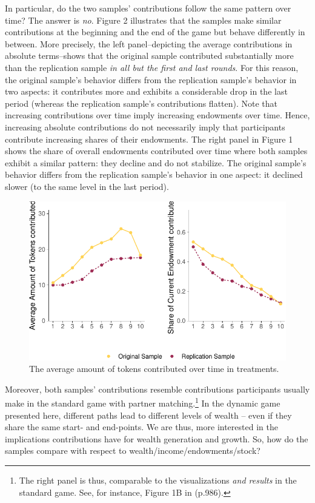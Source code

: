 \documentclass[
  authoryear,
  preprint,
  3p]{elsarticle}
\begin{document}
In particular, do the two samples' contributions follow the same pattern
over time? The answer is \emph{no}. Figure 2 illustrates that the
samples make similar contributions at the beginning and the end of the
game but behave differently in between. More precisely, the left
panel--depicting the average contributions in absolute terms--shows that
the original sample contributed substantially more than the replication
sample \emph{in all but the first and last rounds}. For this reason, the
original sample's behavior differs from the replication sample's
behavior in two aspects: it contributes more and exhibits a considerable
drop in the last period (whereas the replication sample's contributions
flatten). Note that increasing contributions over time imply increasing
endowments over time. Hence, increasing absolute contributions do not
necessarily imply that participants contribute increasing shares of
their endowments. The right panel in Figure 1 shows the share of overall
endowments contributed over time where both samples exhibit a similar
pattern: they decline and do not stabilize. The original sample's
behavior differs from the replication sample's behavior in one aspect:
it declined slower (to the same level in the last period).

\begin{figure}

{\centering \includegraphics{paper_files/figure-pdf/plotShareOfContributions-1.pdf}

}

\caption{The average amount of tokens contributed over time in
treatments.}

\end{figure}

Moreover, both samples' contributions resemble contributions
participants usually make in the standard game with partner
matching.\footnote{The right panel is thus, comparable to the
  visualizations \emph{and results} in the standard game. See, for
  instance, Figure 1B in \citet{fehrgaechter2000} (p.986).} In the
dynamic game presented here, different paths lead to different levels of
wealth -- even if they share the same start- and end-points. We are
thus, more interested in the implications contributions have for wealth
generation and growth. So, how do the samples compare with respect to
wealth/income/endowments/stock?
\end{document}
